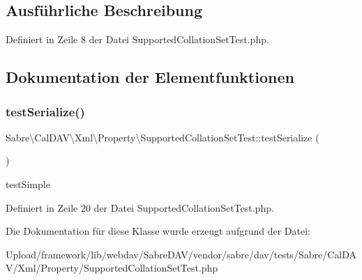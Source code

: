 \subsection{Ausführliche Beschreibung}


Definiert in Zeile 8 der Datei Supported\+Collation\+Set\+Test.\+php.



\subsection{Dokumentation der Elementfunktionen}
\mbox{\label{class_sabre_1_1_cal_d_a_v_1_1_xml_1_1_property_1_1_supported_collation_set_test_a25e64f59300cf6818576a67ec7dedf53}} 
\subsubsection{\texorpdfstring{test\+Serialize()}{testSerialize()}}
{\footnotesize\ttfamily Sabre\textbackslash{}\+Cal\+D\+A\+V\textbackslash{}\+Xml\textbackslash{}\+Property\textbackslash{}\+Supported\+Collation\+Set\+Test\+::test\+Serialize (\begin{DoxyParamCaption}{ }\end{DoxyParamCaption})}

test\+Simple 

Definiert in Zeile 20 der Datei Supported\+Collation\+Set\+Test.\+php.



Die Dokumentation für diese Klasse wurde erzeugt aufgrund der Datei\+:\begin{DoxyCompactItemize}
\item 
Upload/framework/lib/webdav/\+Sabre\+D\+A\+V/vendor/sabre/dav/tests/\+Sabre/\+Cal\+D\+A\+V/\+Xml/\+Property/Supported\+Collation\+Set\+Test.\+php\end{DoxyCompactItemize}
